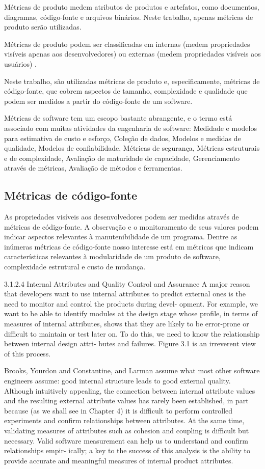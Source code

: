 Métricas de produto medem atributos de produtos e artefatos, como documentos,
diagramas, código-fonte e arquivos binários. Neste trabalho,
apenas métricas de produto serão utilizadas.

Métricas de produto podem ser classificadas em internas (medem propriedades
visíveis apenas aos desenvolvedores) ou externas (medem propriedades visíveis
aos usuários) \cite{Mohamed1994}.

Neste trabalho, são utilizadas métricas de produto e, especificamente,
métricas de código-fonte, que cobrem aspectos de tamanho, complexidade e
qualidade que podem ser medidos a partir do código-fonte de um software.

Métricas de software tem um escopo bastante abrangente, e o termo está
associado com muitas atividades da engenharia de software: Medidade e modelos
para estimativa de custo e esforço, Coleção de dados, Modelos e medidas de
qualidade, Modelos de confiabilidade, Métricas de segurança, Métricas
estruturais e de complexidade, Avaliação de maturidade de capacidade,
Gerenciamento através de métricas, Avaliação de métodos e ferramentas.

\subsection{Métricas de código-fonte} \label{metricas-de-codigo}

As propriedades visíveis aos desenvolvedores podem ser medidas através de
métricas de código-fonte. A observação e o monitoramento de seus valores podem
indicar aspectos relevantes à manutenibilidade de um programa. Dentre as
inúmeras métricas de código-fonte nosso interesse está em métricas que indicam
características relevantes à modularidade de um produto de software,
complexidade estrutural e custo de mudança.

3.1.2.4 Internal Attributes and Quality Control and Assurance
A major reason that developers want to use internal attributes to predict
external ones is the need to monitor and control the products during devel-
opment. For example, we want to be able to identify modules at the design
stage whose profile, in terms of measures of internal attributes, shows that
they are likely to be error-prone or difficult to maintain or test later on. To
do this, we need to know the relationship between internal design attri-
butes and failures. Figure 3.1 is an irreverent view of this process.

Brooks, Yourdon and Constantine, and Larman assume what most
other software engineers assume: good internal structure leads to good
external quality. Although intuitively appealing, the connection between
internal attribute values and the resulting external attribute values has
rarely been established, in part because (as we shall see in Chapter 4) it
is difficult to perform controlled experiments and confirm relationships
between attributes. At the same time, validating measures of attributes
such as cohesion and coupling is difficult but necessary. Valid software
measurement can help us to understand and confirm relationships empir-
ically; a key to the success of this analysis is the ability to provide accurate
and meaningful measures of internal product attributes.

